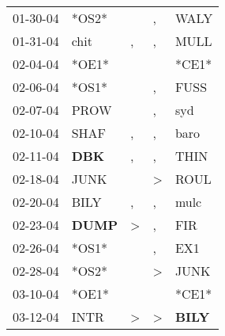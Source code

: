 \begin{supertabular}{p{0.07\textwidth}p{0.06\textwidth}p{0.02\textwidth}p{0.02\textwidth}p{0.06\textwidth}}
          01-30-04\textsuperscript{} &                            *OS2* &                  &                , &           WALY\textsuperscript{} \\
          01-31-04\textsuperscript{} &           chit\textsuperscript{} &                , &                , &           MULL\textsuperscript{} \\
          02-04-04\textsuperscript{} &                            *OE1* &                  &                  &                            *CE1* \\
          02-06-04\textsuperscript{} &                            *OS1* &                  &                , &           FUSS\textsuperscript{} \\
          02-07-04\textsuperscript{} &           PROW\textsuperscript{} &                  &                , &            syd\textsuperscript{} \\
          02-10-04\textsuperscript{} &           SHAF\textsuperscript{} &                , &                , &           baro\textsuperscript{} \\
          02-11-04\textsuperscript{} &   \textbf{DBK\textsuperscript{}} &                , &                , &           THIN\textsuperscript{} \\
          02-18-04\textsuperscript{} &           JUNK\textsuperscript{} &                  &     \textgreater &           ROUL\textsuperscript{} \\
          02-20-04\textsuperscript{} &           BILY\textsuperscript{} &                , &                , &           mulc\textsuperscript{} \\
          02-23-04\textsuperscript{} &  \textbf{DUMP\textsuperscript{}} &     \textgreater &                , &            FIR\textsuperscript{} \\
          02-26-04\textsuperscript{} &                            *OS1* &                  &                , &            EX1\textsuperscript{} \\
          02-28-04\textsuperscript{} &                            *OS2* &                  &     \textgreater &           JUNK\textsuperscript{} \\
          03-10-04\textsuperscript{} &                            *OE1* &                  &                  &                            *CE1* \\
          03-12-04\textsuperscript{} &           INTR\textsuperscript{} &     \textgreater &     \textgreater &  \textbf{BILY\textsuperscript{}} \\

\end{supertabular}
